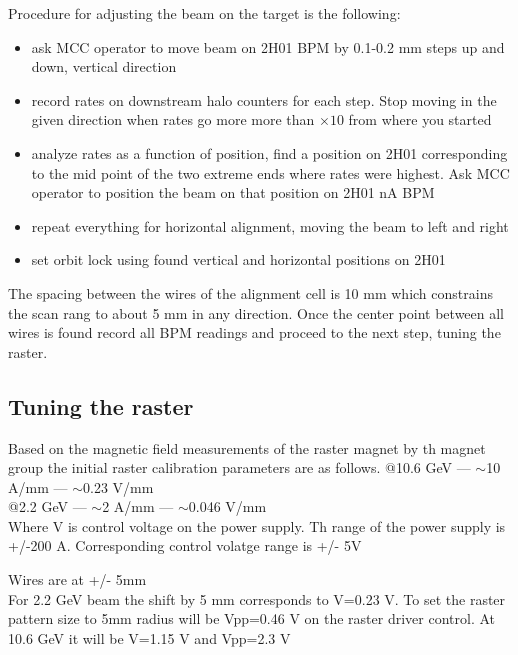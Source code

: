 Procedure for adjusting the beam on the target is the following:
\begin{itemize}
\item ask MCC operator to move beam on 2H01 BPM by 0.1-0.2 mm steps up and down, vertical direction
\item record rates on downstream halo counters for each step. Stop moving in the given direction when rates go more more than $\times 10$ from where you started 
\item analyze rates as a function of position, find a position on 2H01 corresponding to the mid point of the two extreme ends where rates were highest. Ask MCC operator to position the beam on that position on 2H01 nA BPM
\item  repeat everything for horizontal alignment, moving the beam to left and right 
\item set orbit lock using found vertical and horizontal positions on 2H01 
\end{itemize}

The spacing between the wires of the alignment cell is 10 mm which constrains the scan rang to about 5 mm in any direction.
Once the center point between all wires is found record all BPM readings and proceed to the next step, tuning the raster.

\subsection{Tuning the raster}

Based on the magnetic field measurements of the raster magnet by th magnet group the initial raster calibration parameters are as follows.
\noindent
@10.6 GeV ---  $\sim$10 A/mm --- $\sim$0.23 V/mm\\
@2.2 GeV --- $\sim$2 A/mm --- $\sim$0.046 V/mm\\
Where V is control voltage on the power supply. Th range of the power supply is +/-200 A.
Corresponding control volatge range is +/- 5V

Wires are at +/- 5mm\\
\noindent
For 2.2 GeV beam the shift by 5 mm corresponds to V=0.23 V. To set the raster pattern size to 5mm radius  will be Vpp=0.46 V  on the raster driver control.
At 10.6 GeV it will be V=1.15 V and Vpp=2.3 V\\


